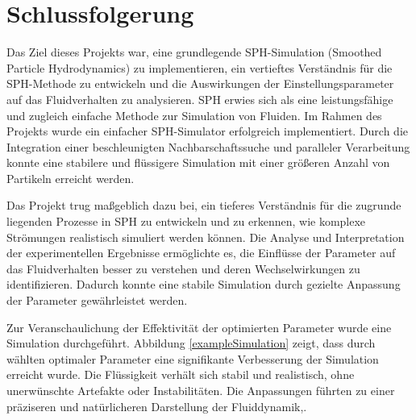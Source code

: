 \documentclass[a4paper, 12pt]{article}
\begin{document}
\section{Schlussfolgerung}
Das Ziel dieses Projekts war, eine grundlegende SPH-Simulation (Smoothed Particle Hydrodynamics) zu implementieren, ein vertieftes Verständnis für die SPH-Methode zu entwickeln und die Auswirkungen der Einstellungsparameter auf das Fluidverhalten zu analysieren. SPH erwies sich als eine leistungsfähige und zugleich einfache Methode zur Simulation von Fluiden. Im Rahmen des Projekts wurde ein einfacher SPH-Simulator erfolgreich implementiert. Durch die Integration einer beschleunigten Nachbarschaftssuche und paralleler Verarbeitung konnte eine stabilere und flüssigere Simulation mit einer größeren Anzahl von Partikeln erreicht werden.

Das Projekt trug maßgeblich dazu bei, ein tieferes Verständnis für die zugrunde liegenden Prozesse in SPH zu entwickeln und zu erkennen, wie komplexe Strömungen realistisch simuliert werden können. Die Analyse und Interpretation der experimentellen Ergebnisse ermöglichte es, die Einflüsse der Parameter auf das Fluidverhalten besser zu verstehen und deren Wechselwirkungen zu identifizieren. Dadurch konnte eine stabile Simulation durch gezielte Anpassung der Parameter gewährleistet werden.

Zur Veranschaulichung der Effektivität der optimierten Parameter wurde eine Simulation durchgeführt. Abbildung \ref{exampleSimulation} zeigt, dass durch wählten optimaler Parameter eine signifikante Verbesserung der Simulation erreicht wurde. Die Flüssigkeit verhält sich stabil und realistisch, ohne unerwünschte Artefakte oder Instabilitäten. Die Anpassungen führten zu einer präziseren und natürlicheren Darstellung der Fluiddynamik,.
\end{document}
